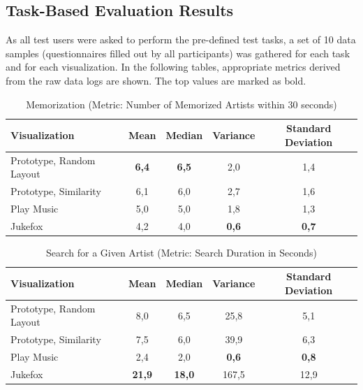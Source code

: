 \subsection{Task-Based Evaluation Results}
\label{sec:taskbased-evaluation-results}

As all test users were asked to perform the pre-defined test tasks, a set of 10 data samples (questionnaires filled out by all participants) was gathered for each task and for each visualization. In the following tables, appropriate metrics derived from the raw data logs are shown. The top values are marked as bold.

\begin{table}[H]
\begin{center}
\begin{tabular}{ | l | c | c | c | c |}
	\hline
	\textbf{Visualization} & \textbf{Mean} & \textbf{Median} & \textbf{Variance} & \textbf{Standard Deviation}\\ \hline
	Prototype, Random Layout & \textbf{6,4} & \textbf{6,5} & 2,0 & 1,4 \\ \hline
	Prototype, Similarity & 6,1 & 6,0 & 2,7 & 1,6 \\ \hline
	Play Music & 5,0 & 5,0 & 1,8 & 1,3 \\ \hline
	Jukefox & 4,2 & 4,0 & \textbf{0,6} & \textbf{0,7} \\ \hline
\end{tabular}
\caption {Memorization (Metric: Number of Memorized Artists within 30 seconds)} \label{tab:memorization} 
\end{center}
\end{table}

\begin{table}[H]
\begin{center}
\begin{tabular}{ | l | c | c | c | c |}
	\hline
	\textbf{Visualization} & \textbf{Mean} & \textbf{Median} & \textbf{Variance} & \textbf{Standard Deviation}\\ \hline
	Prototype, Random Layout & 8,0 & 6,5 & 25,8 & 5,1 \\ \hline
	Prototype, Similarity & 7,5 & 6,0 & 39,9 & 6,3 \\ \hline
	Play Music & 2,4 & 2,0 & \textbf{0,6} & \textbf{0,8} \\ \hline
	Jukefox & \textbf{21,9} & \textbf{18,0} & 167,5 & 12,9 \\ \hline
\end{tabular}
\caption {Search for a Given Artist (Metric: Search Duration in Seconds)} \label{tab:search-for-given} 
\end{center}
\end{table}

